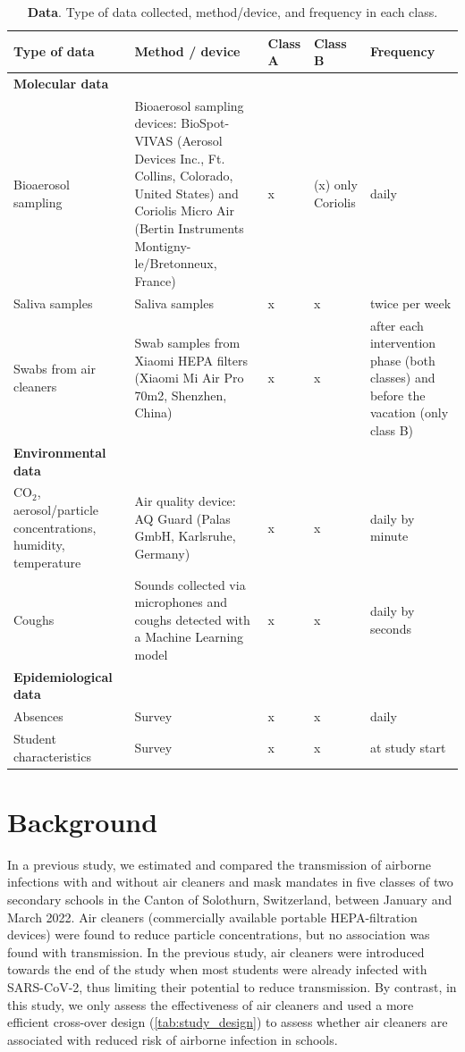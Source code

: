 \documentclass{article}
\begin{document}
\begin{table}[!htpb]
    \footnotesize
    \centering
    \caption{\textbf{Data}. Type of data collected, method/device, and frequency in each class.}
    \begin{tabular}{p{3.5cm}p{6cm} p{1cm} p{1cm} p{3cm}}
    \midrule
    Type of data & Method / device & Class A & Class B & Frequency \\
    \midrule
    \textbf{Molecular data} \\
    \midrule
    Bioaerosol sampling & Bioaerosol sampling devices: BioSpot-VIVAS (Aerosol Devices Inc., Ft. Collins, Colorado, United States) and Coriolis Micro Air (Bertin Instruments Montigny-le/Bretonneux, France) & x & (x) \newline only Coriolis & daily \\
    Saliva samples & Saliva samples & x & x & twice per week \\
    Swabs from air cleaners & Swab samples from Xiaomi HEPA filters (Xiaomi Mi Air Pro 70m2, Shenzhen, China) & x & x & after each intervention phase (both classes) and before the vacation (only class B) \\ 
    \midrule
    \textbf{Environmental data} \\
    \midrule
    CO$_2$, aerosol/particle concentrations, humidity, temperature & Air quality device: AQ Guard (Palas GmbH, Karlsruhe, Germany) & x & x & daily by minute \\
    Coughs & Sounds collected via microphones and coughs detected with a Machine Learning model\cite{Bertschinger2023} & x & x & daily by seconds \\
    \midrule
    \textbf{Epidemiological data} \\
    \midrule
    Absences & Survey & x & x & daily \\
    Student characteristics & Survey & x & x & at study start \\
    \bottomrule
    \end{tabular}
    \label{tab:data}
\end{table}

\section{Background}

In a previous study, we estimated and compared the transmission of airborne infections with and without air cleaners and mask mandates in five classes of two secondary schools in the Canton of Solothurn, Switzerland, between January and March 2022\cite{Banholzer2023}. Air cleaners (commercially available portable HEPA-filtration devices) were found to reduce particle concentrations, but no association was found with transmission. In the previous study, air cleaners were introduced towards the end of the study when most students were already infected with SARS-CoV-2, thus limiting their potential to reduce transmission. By contrast, in this study, we only assess the effectiveness of air cleaners and used a more efficient cross-over design (\cref{tab:study_design}) to assess whether air cleaners are associated with reduced risk of airborne infection in schools.
\end{document}
